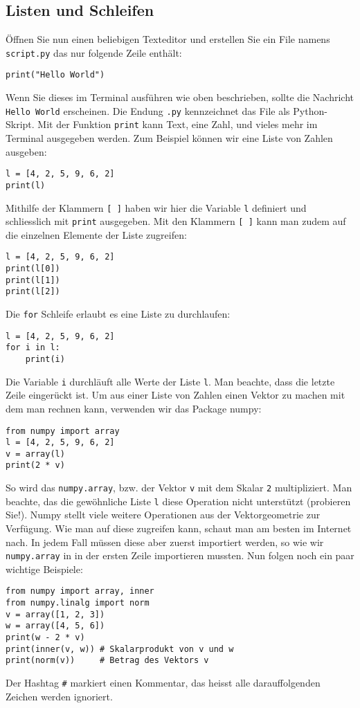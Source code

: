 \subsection{Listen und Schleifen}
Öffnen Sie nun einen beliebigen Texteditor und erstellen Sie ein File namens \texttt{script.py} das nur folgende Zeile enthält:
\begin{lstlisting}[style=python]
print("Hello World")
\end{lstlisting}
Wenn Sie dieses im Terminal ausführen wie oben beschrieben, sollte die Nachricht \texttt{Hello World} erscheinen.
Die Endung \texttt{.py} kennzeichnet das File als Python-Skript.
Mit der Funktion \texttt{print} kann Text, eine Zahl, und vieles mehr im Terminal ausgegeben werden.
Zum Beispiel können wir eine Liste von Zahlen ausgeben:
\begin{lstlisting}[style=python]
l = [4, 2, 5, 9, 6, 2]
print(l)
\end{lstlisting}
Mithilfe der Klammern \texttt{[ ]} haben wir hier die Variable \texttt{l} definiert und schliesslich mit \texttt{print} ausgegeben.
Mit den Klammern \texttt{[ ]} kann man zudem auf die einzelnen Elemente der Liste zugreifen:
\begin{lstlisting}[style=python]
l = [4, 2, 5, 9, 6, 2]
print(l[0])
print(l[1])
print(l[2])
\end{lstlisting}
Die \texttt{for} Schleife erlaubt es eine Liste zu durchlaufen:
\begin{lstlisting}[style=python]
l = [4, 2, 5, 9, 6, 2]
for i in l:
	print(i)
\end{lstlisting}
Die Variable \texttt{i} durchläuft alle Werte der Liste \texttt{l}.
Man beachte, dass die letzte Zeile eingerückt ist.
Um aus einer Liste von Zahlen einen Vektor zu machen mit dem man rechnen kann, verwenden wir das Package numpy:
\begin{lstlisting}[style=python]
from numpy import array
l = [4, 2, 5, 9, 6, 2]
v = array(l)
print(2 * v)
\end{lstlisting}
So wird das \texttt{numpy.array}, bzw. der Vektor \texttt{v} mit dem Skalar \texttt{2} multipliziert.
Man beachte, das die gewöhnliche Liste \texttt{l} diese Operation nicht unterstützt (probieren Sie!).
Numpy stellt viele weitere Operationen aus der Vektorgeometrie zur Verfügung.
Wie man auf diese zugreifen kann, schaut man am besten im Internet nach.
In jedem Fall müssen diese aber zuerst importiert werden, so wie wir \texttt{numpy.array} in in der ersten Zeile importieren mussten.
Nun folgen noch ein paar wichtige Beispiele:
\begin{lstlisting}[style=python]
from numpy import array, inner
from numpy.linalg import norm
v = array([1, 2, 3])
w = array([4, 5, 6])
print(w - 2 * v)
print(inner(v, w)) # Skalarprodukt von v und w
print(norm(v))     # Betrag des Vektors v
\end{lstlisting}
Der Hashtag \texttt{\#} markiert einen Kommentar, das heisst alle darauffolgenden Zeichen werden ignoriert.

